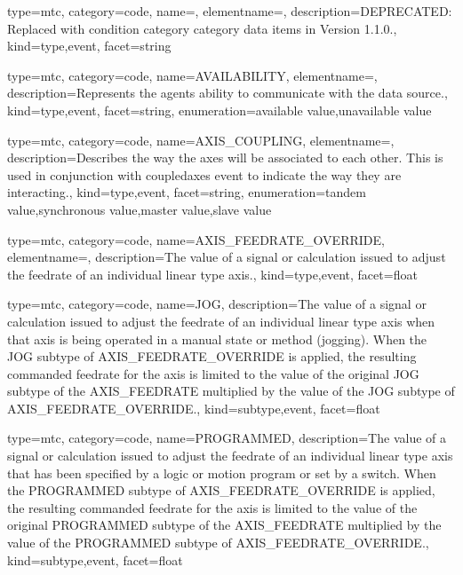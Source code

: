 {
  type=mtc,
  category=code,
  name=,
  elementname=,
  description={DEPRECATED: Replaced with \gls{condition category} category data items in Version 1.1.0.},
  kind={type,event},
  facet={\gls{string}}
}


{
  type=mtc,
  category=code,
  name={AVAILABILITY},
  elementname=,
  description={Represents the \gls{agent}s ability to communicate with the data source.},
  kind={type,event},
  facet={\gls{string}},
  enumeration={\gls{available value},\gls{unavailable value}}
}


{
  type=mtc,
  category=code,
  name={AXIS\_COUPLING},
  elementname=,
  description={Describes the way the axes will be associated to each other. This is used in conjunction with \gls{coupledaxes event} to indicate the way they are interacting.},
  kind={type,event},
  facet={\gls{string}},
  enumeration={\gls{tandem value},\gls{synchronous value},\gls{master value},\gls{slave value}}
}


{
  type=mtc,
  category=code,
  name={AXIS\_FEEDRATE\_OVERRIDE},
  elementname=,
  description={The value of a signal or calculation issued to adjust the feedrate of an individual linear type axis.},
  kind={type,event},
  facet={\gls{float}}
}


{
  type=mtc,
  category=code,
  name={JOG},
  description={The value of a signal or calculation issued to adjust the feedrate of an individual linear type axis when that axis is being operated in a manual state or method (jogging).   \newline When the JOG subtype of AXIS\_FEEDRATE\_OVERRIDE is applied, the resulting commanded feedrate for the axis is limited to the value of the original JOG subtype of the AXIS\_FEEDRATE multiplied by the value of the JOG subtype of AXIS\_FEEDRATE\_OVERRIDE.},
  kind={subtype,event},
  facet={\gls{float}}
}


{
  type=mtc,
  category=code,
  name={PROGRAMMED},
  description={The value of a signal or calculation issued to adjust the feedrate of an individual linear type axis that has been specified by a logic or motion program or set by a switch. \newline When the PROGRAMMED subtype of AXIS\_FEEDRATE\_OVERRIDE is applied, the resulting commanded feedrate for the axis is limited to the value of the original PROGRAMMED subtype of the AXIS\_FEEDRATE multiplied by the value of the PROGRAMMED subtype of AXIS\_FEEDRATE\_OVERRIDE.},
  kind={subtype,event},
  facet={\gls{float}}
}


